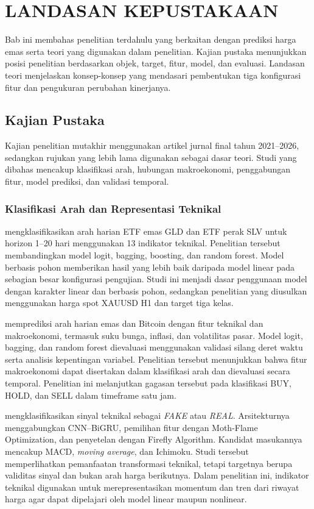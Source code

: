 \chapter{LANDASAN KEPUSTAKAAN}

Bab ini membahas penelitian terdahulu yang berkaitan dengan prediksi harga emas serta teori yang digunakan dalam penelitian. Kajian pustaka menunjukkan posisi penelitian berdasarkan objek, target, fitur, model, dan evaluasi. Landasan teori menjelaskan konsep-konsep yang mendasari pembentukan tiga konfigurasi fitur dan pengukuran perubahan kinerjanya.

\section{Kajian Pustaka}

Kajian penelitian mutakhir menggunakan artikel jurnal final tahun 2021--2026, sedangkan rujukan yang lebih lama digunakan sebagai dasar teori. Studi yang dibahas mencakup klasifikasi arah, hubungan makroekonomi, penggabungan fitur, model prediksi, dan validasi temporal.

\subsection{Klasifikasi Arah dan Representasi Teknikal}

\textcite{sadorsky2021predicting} mengklasifikasikan arah harian ETF emas GLD dan ETF perak SLV untuk horizon 1--20 hari menggunakan 13 indikator teknikal. Penelitian tersebut membandingkan model logit, bagging, boosting, dan random forest. Model berbasis pohon memberikan hasil yang lebih baik daripada model linear pada sebagian besar konfigurasi pengujian. Studi ini menjadi dasar penggunaan model dengan karakter linear dan berbasis pohon, sedangkan penelitian yang diusulkan menggunakan harga spot XAUUSD H1 dan target tiga kelas.

\textcite{basher2022forecasting} memprediksi arah harian emas dan Bitcoin dengan fitur teknikal dan makroekonomi, termasuk suku bunga, inflasi, dan volatilitas pasar. Model logit, bagging, dan random forest dievaluasi menggunakan validasi silang deret waktu serta analisis kepentingan variabel. Penelitian tersebut menunjukkan bahwa fitur makroekonomi dapat disertakan dalam klasifikasi arah dan dievaluasi secara temporal. Penelitian ini melanjutkan gagasan tersebut pada klasifikasi BUY, HOLD, dan SELL dalam timeframe satu jam.

\textcite{mamoudan2023hybrid} mengklasifikasikan sinyal teknikal sebagai \emph{FAKE} atau \emph{REAL}. Arsitekturnya menggabungkan CNN--BiGRU, pemilihan fitur dengan Moth-Flame Optimization, dan penyetelan dengan Firefly Algorithm. Kandidat masukannya mencakup MACD, \emph{moving average}, dan Ichimoku. Studi tersebut memperlihatkan pemanfaatan transformasi teknikal, tetapi targetnya berupa validitas sinyal dan bukan arah harga berikutnya. Dalam penelitian ini, indikator teknikal digunakan untuk merepresentasikan momentum dan tren dari riwayat harga agar dapat dipelajari oleh model linear maupun nonlinear.

